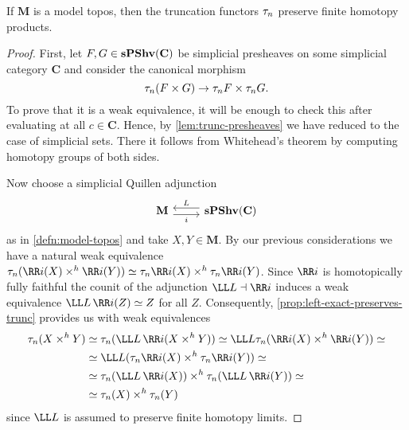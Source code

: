 \begin{proposition}\label{prop:trunc-products}
  If \(\mathbf M\) is a model topos, then the truncation functors \(\tau_{n}\) preserve finite homotopy products.
\end{proposition}
\begin{proof}
  First, let \(F,G\in\operatorname{\textnormal{\bfseries sPShv}}(\mathbf C)\) be simplicial presheaves on some simplicial category \(\mathbf C\) and consider the canonical morphism
  \[\tau_{n}(F\times G)\to \tau_{n}F\times\tau_{n}G.\]
  To prove that it is a weak equivalence, it will be enough to check this after evaluating at all \(c\in\mathbf C\). Hence, by \autoref{lem:trunc-presheaves} we have reduced to the case of simplicial sets. There it follows from Whitehead's theorem by computing homotopy groups of both sides.

  Now choose a simplicial Quillen adjunction
  \[
  \begin{tikzcd}
    \mathbf M \arrow[r, shift right=.7ex, "i"'] & \arrow[l, shift right=.7ex, "L"'] \spshv(\mathbf C)
  \end{tikzcd}
  \]
  as in \autoref{defn:model-topos} and take \(X, Y\in\mathbf M\). By our previous considerations we have a natural weak equivalence \(\trunc{n}(\RR i(X)\times^{h}\RR i(Y))\simeq \trunc{n}\RR i(X)\times^{h}\trunc{n}\RR i(Y)\). Since \(\RR i\) is homotopically fully faithful the counit of the adjunction \(\LL L\dashv \RR i\) induces a weak equivalence \(\LL L\,\RR i (Z)\simeq Z\) for all \(Z\). Consequently, \autoref{prop:left-exact-preserves-trunc} provides us with weak equivalences
  \begin{align*}
    \trunc{n}(X\times^{h} Y) &\simeq \trunc{n}(\LL L\,\RR i(X\times^{h} Y)) \simeq \LL L\trunc{n}(\RR i(X)\times^{h} \RR i(Y)) \simeq \\
                         &\simeq \LL L(\trunc{n}\RR i(X)\times^{h} \trunc{n}\RR i(Y)) \simeq \\
                         &\simeq \trunc{n}(\LL L\,\RR i(X)) \times^{h} \trunc{n}(\LL L\,\RR i(Y)) \simeq \\
                         &\simeq \trunc{n}(X) \times^{h} \trunc{n}(Y)
  \end{align*}
  since \(\LL L\) is assumed to preserve finite homotopy limits.
\end{proof}


